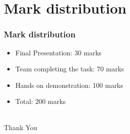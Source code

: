 \documentclass{beamer}
\begin{document}
\section{Mark distribution}
\begin{frame}
 \frametitle {Mark distribution}
 \begin{itemize}
  \item {} {Final Presentation: 30 marks}
  \item {} {Team completing the task: 70 marks}
  \item {} {Hands on demonstration: 100 marks}
  \item {} {Total: 200 marks} \\\
 \end{itemize}
\end{frame}


\begin{frame}
\Huge{\centerline{Thank You}}
\end{frame}

\end{document}
